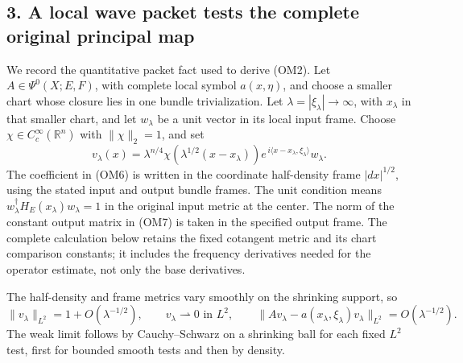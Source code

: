 \documentclass[
  11pt,
]{article}
\makeatletter
\let\ReaderOriginalAnchorStart\hyper@anchorstart
\let\ReaderOriginalAnchorEnd\hyper@anchorend
\let\ReaderPendingAliases\@empty
\def\ReaderArmAliases#1{\gdef\ReaderPendingAliases{#1}}
\def\hyper@anchorstart#1{\ReaderIfNativeAnchorTF{#1}{\ReaderPendingAliases\global\let\ReaderPendingAliases\@empty}{}\ReaderOriginalAnchorStart{#1}}
\makeatother
\begin{document}
\ReaderArmAliases{\ReaderOriginalAnchorStart{AN03-OMF-003}\ReaderOriginalAnchorEnd\begingroup\expandafter\def\csname @currentHref\endcsname{AN03-OMF-003}\label{AN03-OMF-003}\endgroup\ReaderOriginalAnchorStart{3-a-local-wave-packet-tests-the-complete-original-principal-map}\ReaderOriginalAnchorEnd\begingroup\expandafter\def\csname @currentHref\endcsname{3-a-local-wave-packet-tests-the-complete-original-principal-map}\label{3-a-local-wave-packet-tests-the-complete-original-principal-map}\endgroup}
\subsection{3. A local wave packet tests the complete original principal
map}\label{a-local-wave-packet-tests-the-complete-original-principal-map}

We record the quantitative packet fact used to derive (OM2). Let
\(A\in\Psi^0(X;E,F)\), with complete local symbol \(a(x,\eta)\), and
choose a smaller chart whose closure lies in one bundle trivialization.
Let \(\lambda=|\xi_\lambda|\to\infty\), with \(x_\lambda\) in that
smaller chart, and let \(w_\lambda\) be a unit vector in its local input
frame. Choose \(\chi\in C_c^\infty(\mathbb R^n)\) with \(\|\chi\|_2=1\),
and set \[
 v_\lambda(x)
  =\lambda^{n/4}\chi\!\left(\lambda^{1/2}(x-x_\lambda)\right)
     e^{\,i\langle x-x_\lambda,\xi_\lambda\rangle}w_\lambda .
 \tag{OM6}
\] The coefficient in (OM6) is written in the coordinate half-density
frame \(|dx|^{1/2}\), using the stated input and output bundle frames.
The unit condition means \(w_\lambda^\dagger H_E(x_\lambda)w_\lambda=1\)
in the original input metric at the center. The norm of the constant
output matrix in (OM7) is taken in the specified output frame. The
complete calculation below retains the fixed cotangent metric and its
chart comparison constants; it includes the frequency derivatives needed
for the operator estimate, not only the base derivatives.

The half-density and frame metrics vary smoothly on the shrinking
support, so \[
 \|v_\lambda\|_{L^2}=1+O(\lambda^{-1/2}),\qquad
 v_\lambda\rightharpoonup0\text{ in }L^2,\qquad
 \|Av_\lambda-a(x_\lambda,\xi_\lambda)v_\lambda\|_{L^2}
       =O(\lambda^{-1/2}).
 \tag{OM7}
\] The weak limit follows by Cauchy--Schwarz on a shrinking ball for
each fixed \(L^2\) test, first for bounded smooth tests and then by
density.
\end{document}
